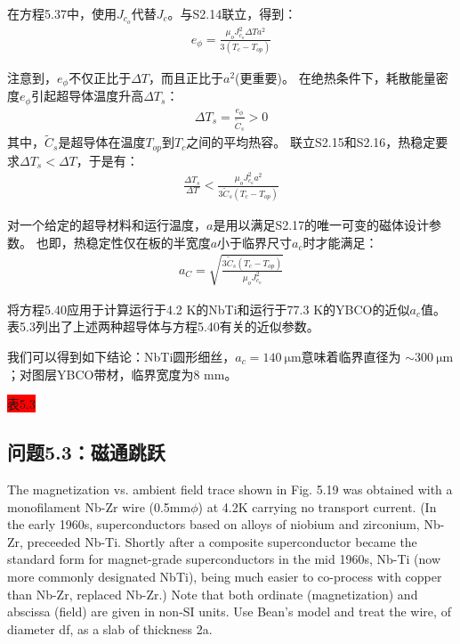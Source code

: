 在方程5.37中，使用$J_{c_o}$代替$J_c$。与S2.14联立，得到：
\begin{align*}%
e_{\phi}=\frac{\mu_{o}J_{c_{o}}^{2}\Delta T a^{2}}{3(T_{c}-T_{op})}\tag{S2.15}
\end{align*}

注意到，$e_{\phi}$不仅正比于$\Delta T$，而且正比于$a^2$(更重要)。
在绝热条件下，耗散能量密度$e_{\phi}$引起超导体温度升高$\Delta T_s$：
\begin{align*}%
\Delta T_{s}=\frac{e_{\phi}}{\tilde{C}_{s}}>0\tag{S2.16}
\end{align*}
其中，$\tilde{C}_{s}$是超导体在温度$T_{op}$到$T_c$之间的平均热容。
联立S2.15和S2.16，热稳定要求$\Delta T_s <\Delta T$，于是有：
\begin{align*}%
\frac{\Delta T_{s}}{\Delta T}<\frac{\mu_{o}J_{c_{o}}^{2}a^{2}}{3\tilde{C}_{s}(T_{c}-T_{op})}\tag{S2.17}
\end{align*}

对一个给定的超导材料和运行温度，$a$是用以满足S2.17的唯一可变的磁体设计参数。
也即，热稳定性仅在板的半宽度$a$小于临界尺寸$a_c$时才能满足：
\begin{align*}%
a_{C}=\sqrt{\frac{3\tilde{C}_{s}(T_{c}-T_{op})}{\mu_{o}J_{c_{o}}^{2}}}\tag{5.40}
\end{align*}

将方程5.40应用于计算运行于4.2 K的NbTi和运行于77.3 K的YBCO的近似$a_c$值。
 表5.3列出了上述两种超导体与方程5.40有关的近似参数。

我们可以得到如下结论：NbTi圆形细丝，$a_c=140\ \mathrm{\mu m}$意味着临界直径为
$\sim 300\ \mathrm{\mu m}$；对图层YBCO带材，临界宽度为8 mm。

\colorbox{red}{表5.3}

\subsection{问题5.3：磁通跳跃}
The magnetization vs. ambient field trace shown in Fig. 5.19 was obtained with a
monofilament Nb-Zr wire (0.5mm$\phi$) at 4.2K carrying no transport current. (In
the early 1960s, superconductors based on alloys of niobium and zirconium, Nb-Zr,
preceeded Nb-Ti. Shortly after a composite superconductor became the standard
form for magnet-grade superconductors in the mid 1960s, Nb-Ti (now more commonly
designated NbTi), being much easier to co-process with copper than Nb-Zr,
replaced Nb-Zr.) Note that both ordinate (magnetization) and abscissa (field) are
given in non-SI units. Use Bean’s model and treat the wire, of diameter df, as a
slab of thickness 2a.

